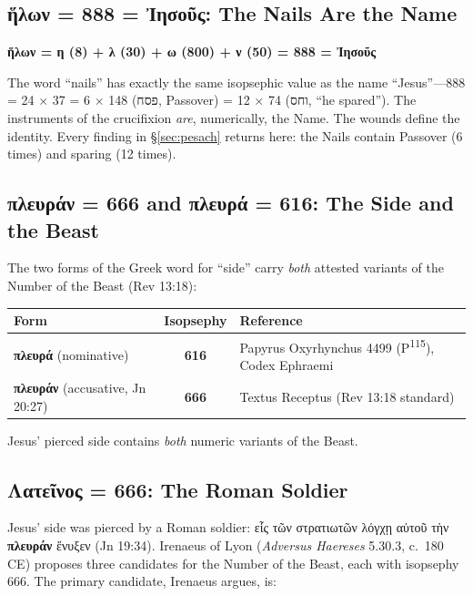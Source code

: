 \documentclass[12pt,a4paper]{article}
\begin{document}
\subsection{ἥλων = 888 = Ἰησοῦς: The Nails Are the Name}

\begin{center}
\textbf{ἥλων = η (8) + λ (30) + ω (800) + ν (50) = 888 = Ἰησοῦς}
\end{center}

The word ``nails'' has exactly the same isopsephic value as the name ``Jesus''---888 = 24 $\times$ 37 = 6 $\times$ 148 (פסח, Passover) = 12 $\times$ 74 (וחס, ``he spared''). The instruments of the crucifixion \textit{are}, numerically, the Name. The wounds define the identity. Every finding in \S\ref{sec:pesach} returns here: the Nails contain Passover (6 times) and sparing (12 times).

\subsection{πλευράν = 666 and πλευρά = 616: The Side and the Beast}

The two forms of the Greek word for ``side'' carry \textit{both} attested variants of the Number of the Beast (Rev 13:18):

\begin{center}
\begin{tabular}{lcl}
\toprule
\textbf{Form} & \textbf{Isopsephy} & \textbf{Reference} \\
\midrule
\textbf{πλευρά} (nominative) & \textbf{616} & Papyrus Oxyrhynchus 4499 (P\textsuperscript{115}), Codex Ephraemi \\
\textbf{πλευράν} (accusative, Jn 20:27) & \textbf{666} & Textus Receptus (Rev 13:18 standard) \\
\bottomrule
\end{tabular}
\end{center}

Jesus' pierced side contains \textit{both} numeric variants of the Beast.

\subsection{Λατεῖνος = 666: The Roman Soldier}

Jesus' side was pierced by a Roman soldier: εἷς τῶν στρατιωτῶν λόγχῃ αὐτοῦ τὴν \textbf{πλευράν} ἔνυξεν (Jn 19:34). Irenaeus of Lyon (\textit{Adversus Haereses} 5.30.3, c.~180 CE) proposes three candidates for the Number of the Beast, each with isopsephy 666. The primary candidate, Irenaeus argues, is:
\end{document}
